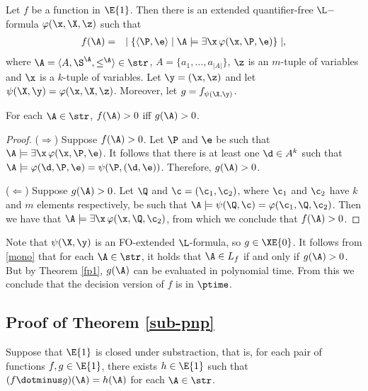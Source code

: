 Let $f$ be a function in $\E{1}$. Then there is an extended quantifier-free $\L-$formula $\varphi(\x,\X,\z)$ such that
\begin{eqnarray*}
	f(\A) &=& \mid \{ \langle\P,\e\rangle \mid \A \models \exists \x \, \varphi(\x,\P,\e) \} \mid,
\end{eqnarray*}
where $\A = \langle A, \S^{\A}, \leq^{\A} \rangle \in \str$, $A = \{a_1,\ldots,a_{\vert A \vert}\}$, $\z$ is an $m$-tuple of variables and $\x$ is a $k$-tuple of variables. Let $\y = (\x,\z)$ and let $\psi(\X,\y) = \varphi(\x,\X,\z)$. Moreover, let $g = f_{\psi(\X,\y)}$.
\begin{claim} \label{mono}
	For each $\A \in \str$, $f(\A) > 0$ iff $g(\A) > 0$.
\end{claim}
\begin{proof}
	($\Rightarrow$) Suppose $f(\A) > 0$. Let $\P$ and $\e$ be such that $\A \models \exists \x \, \varphi(\x,\P,\e)$. It follows that there is at least one $\d \in A^k$ such that $\A \models \varphi(\d,\P,\e) = \psi(\P,(\d,\e))$. Therefore, $g(\A) > 0$. 
	
	($\Leftarrow$) Suppose $g(\A) > 0$. Let $\Q$ and $\c = (\c_1,\c_2)$, where $\c_1$ and $\c_2$ have $k$ and $m$ elements respectively, be such that $\A \models \psi(\Q,\c) = \varphi(\c_1,\Q,\c_2)$. Then we have that $\A \models \exists \x \, \varphi(\x,\Q,\c_2)$, from which we conclude that $f(\A) > 0$.
\end{proof}
Note that $\psi(\X,\y)$ is an {\sc FO}-extended $\L$-formula, so $g \in\XE{0}$. It follows from \ref{mono} that for each $\A \in \str$, it holds that $\A \in L_f$ if and only if $g(\A) > 0$. But by Theorem \ref{fp1}, $g(\A)$ can be evaluated in polynomial time. From this we conclude that the decision version of $f$ is in $\ptime$.
	
\subsection*{Proof of Theorem \ref{sub-pnp}}

Suppose that $\E{1}$ is closed under substraction, that is, for each pair of functions $f,g\in \E{1}$, there exists $h\in\E{1}$ such that $(f\dotminus g)(\A) = h(\A)$ for each $\A\in\str$.

